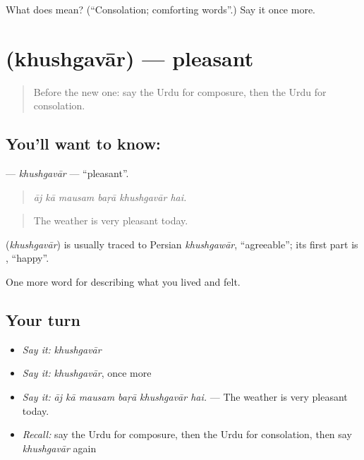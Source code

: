 \begin{tcolorbox}[breakable,colback=teal!4,colframe=teal!35!black,title={Before you move on}]
What does  mean? (\textquotedblleft{}Consolation; comforting words\textquotedblright{}.) Say it once more.
\end{tcolorbox}
\section[\texorpdfstring{\ur{خوشگوار} (khushgavār)}{خوشگوار (khushgavār)}]{ (khushgavār) — pleasant}

\label{lesson:UR-C447-khushgavar}



\begin{quote}
Before the new one: say the Urdu for composure, then the Urdu for consolation.
\end{quote}

\subsection*{You'll want to know: }
\textbf{} — \emph{khushgavār} — \textquotedblleft{}pleasant\textquotedblright{}.

\begin{quote}
     
\end{quote}

\begin{quote}
\emph{āj kā mausam baṛā khushgavār hai.}
\end{quote}

\begin{quote}
The weather is very pleasant today.
\end{quote}

\begin{cousinweb}
\textbf{} (\emph{khushgavār}) is usually traced to Persian \emph{khushgawār}, \textquotedblleft{}agreeable\textquotedblright{}; its first part is \textbf{}, \textquotedblleft{}happy\textquotedblright{}.
\end{cousinweb}

\begin{grammarlens}[title={What you've built}]
One more word for describing what you lived and felt.
\end{grammarlens}

\subsection*{Your turn}
\begin{itemize}
\raggedright
  \item \emph{Say it:} \emph{khushgavār}
  \item \emph{Say it:} \emph{khushgavār}, once more
  \item \emph{Say it:} \emph{āj kā mausam baṛā khushgavār hai.} — The weather is very pleasant today.
  \item \emph{Recall:} say the Urdu for composure, then the Urdu for consolation, then say \emph{khushgavār} again
\end{itemize}

